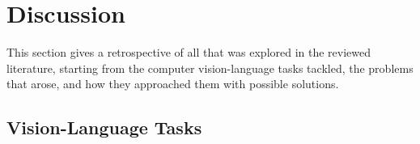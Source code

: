 \graphicspath{{content/chapters/literature_review/discussion/figures}}

\section{Discussion}
\label{sec:literature_review_discussion}

This section gives a retrospective of all that was explored in the reviewed literature, starting from the computer vision-language tasks tackled, the problems that arose, and how they approached them with possible solutions.

\subsection{Vision-Language Tasks}
\label{subsec:discussion_vision_language_tasks}

